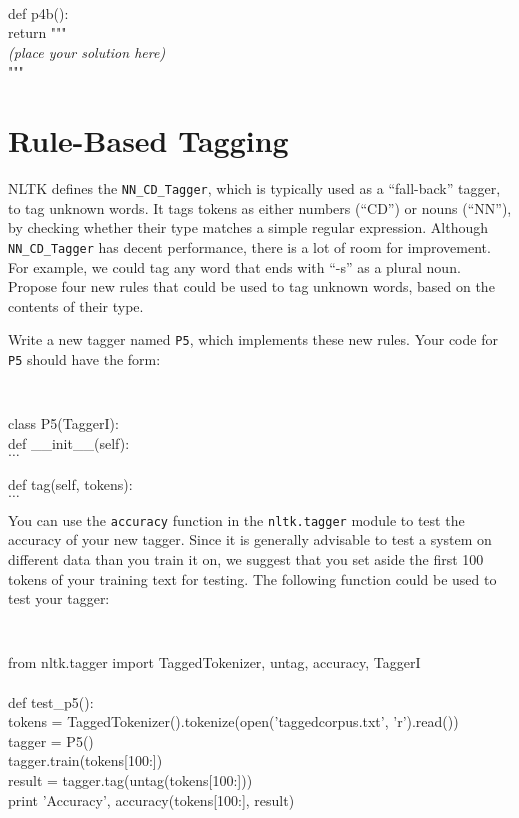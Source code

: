 \documentclass{cis530}
\begin{document}
{\tt
\begin{tabbing}
def p4b():\\
\qquad return """\\
\textit{(place your solution here)}\\
"""
\end{tabbing}
}

\newpage
\section{Rule-Based Tagging}

NLTK defines the \texttt{NN\_CD\_Tagger}, which is typically used as a
``fall-back'' tagger, to tag unknown words.  It tags tokens as either
numbers (``CD'') or nouns (``NN''), by checking whether their type
matches a simple regular expression.  Although \texttt{NN\_CD\_Tagger}
has decent performance, there is a lot of room for improvement.  For
example, we could tag any word that ends with ``-s'' as a plural noun.
Propose four new rules that could be used to tag unknown words, based
on the contents of their type.

Write a new tagger named \texttt{P5}, which implements these new
rules.  Your code for \texttt{P5} should have the form:

{\tt
\begin{tabbing}
class P5(TaggerI):\\
\qquad def \_\_init\_\_(self):\\
\qquad\qquad $\ldots$\\
\\
\qquad def tag(self, tokens):\\
\qquad\qquad $\ldots$
\end{tabbing}
}

You can use the \texttt{accuracy} function in the \texttt{nltk.tagger}
module to test the accuracy of your new tagger.  Since it is generally
advisable to test a system on different data than you train it on, we
suggest that you set aside the first 100 tokens of your training text
for testing.  The following function could be used to test your
tagger:

{\tt
\begin{tabbing}
from nltk.tagger import TaggedTokenizer, untag, accuracy, TaggerI\\
\\
def test\_p5():\\
\qquad tokens = TaggedTokenizer().tokenize(open('taggedcorpus.txt', 'r').read())\\
\qquad tagger = P5()\\
\qquad tagger.train(tokens[100:])\\
\qquad result = tagger.tag(untag(tokens[100:]))\\
\qquad print 'Accuracy', accuracy(tokens[100:], result)
\end{tabbing}
}
\end{document}
